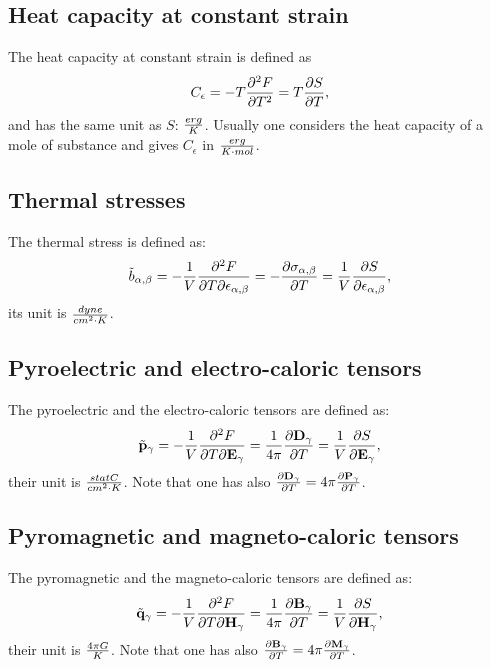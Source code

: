 \documentclass[12pt,a4paper]{article}
\begin{document}
{\subsection{\color{orange}Heat capacity at constant strain}
The heat capacity at constant strain is defined as
\begin{equation}
C_\epsilon= - T {\partial^2 F \over \partial T^2} = 
T {\partial S \over \partial T},
\end{equation}
and has the same unit as $S$: $erg\over K$. Usually one considers the heat
capacity of a mole of substance and gives $C_\epsilon$ in 
${erg\over K \cdot mol}$.

\subsection{\color{orange}Thermal stresses}
The thermal stress is defined as:
\begin{equation}
\tilde b_{\alpha,\beta} = 
-{1\over V} {\partial^2 F \over \partial T
\partial \epsilon_{\alpha,\beta}}=
-{\partial \sigma_{\alpha,\beta} \over \partial T}=
{1\over V} {\partial S \over \partial {\bf \epsilon}_{\alpha,\beta}},
\end{equation}
its unit is ${dyne \over cm^2 \cdot K}$.

\subsection{\color{orange}Pyroelectric and electro-caloric tensors}
The pyroelectric and the electro-caloric tensors are defined as:
\begin{equation}
\tilde {\bf p}_\gamma =
-{1\over V} {\partial^2 F \over \partial T
\partial {\bf E}_\gamma}=
{1\over 4 \pi} {\partial {\bf D}_\gamma \over \partial T}=
{1\over V} {\partial S \over \partial {\bf E}_{\gamma}},
\end{equation}
their unit is ${statC \over cm^2 \cdot K}$. Note that one has also
${\partial {\bf D}_\gamma \over \partial T}=4 \pi
{\partial {\bf P}_\gamma \over \partial T}$. 

\subsection{\color{orange}Pyromagnetic and magneto-caloric tensors}
The pyromagnetic and the magneto-caloric tensors are defined as:
\begin{equation}
\tilde {\bf q}_\gamma = 
-{1\over V} {\partial^2 F \over \partial T
\partial {\bf H}_\gamma}=
{1 \over 4 \pi} {\partial {\bf B}_\gamma \over \partial T}=
{1\over V} {\partial S \over \partial {\bf H}_{\gamma}},
\end{equation}
their unit is ${4 \pi G \over K}$. Note that one has also
${\partial {\bf B}_\gamma \over \partial T}= 4 \pi
{\partial {\bf M}_\gamma \over \partial T}$.

}
\end{document}
